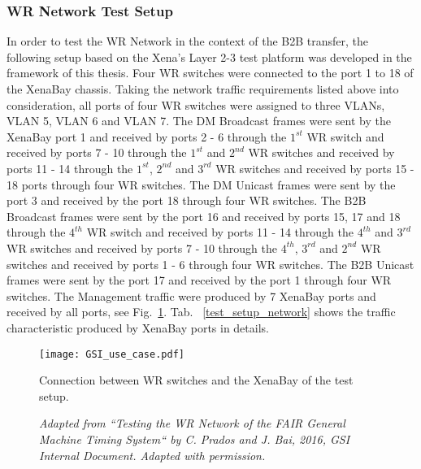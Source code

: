 \subsubsection{WR Network Test Setup}
In order to test the WR Network in the context of the B2B transfer, the following setup based on the Xena's Layer 2-3 test platform was developed in the framework of this thesis. Four WR switches were connected to the port 1 to 18 of the XenaBay chassis. Taking the network traffic requirements listed above into consideration, all ports of four WR switches were assigned to three VLANs, VLAN 5, VLAN 6 and VLAN 7. The DM Broadcast frames were sent by the XenaBay port 1 and received by ports 2 - 6 through the $1^{st}$ WR switch and received by ports 7 - 10 through the $1^{st}$ and $2^{nd}$ WR switches and received by ports 11 - 14 through the $1^{st}$, $2^{nd}$ and $3^{rd}$ WR switches and received by ports 15 - 18 ports through four WR switches. The DM Unicast frames were sent by the port 3 and received by the port 18 through four WR switches. The B2B Broadcast frames were sent by the port 16 and received by ports 15, 17 and 18 through the $4^{th}$ WR switch and received by ports 11 - 14 through the $4^{th}$ and $3^{rd}$ WR switches and received by ports 7 - 10 through the $4^{th}$, $3^{rd}$ and $2^{nd}$ WR switches and received by ports 1 - 6 through four WR switches. The B2B Unicast frames were sent by the port 17 and received by the port 1 through four WR switches. The Management traffic were produced by 7 XenaBay ports and received by all ports, see Fig.~\ref{GSI_use_case.jpg}.  Tab. ~\ref{test_setup_network} shows the traffic characteristic produced by XenaBay ports in details. 
\begin{figure}[H]
   \centering   
   \texttt{[image: GSI\_use\_case.pdf]}
   \caption{Connection between WR switches and the XenaBay of the test setup.}
    \caption*{\textsl{\small{Adapted from ``Testing the WR Network of the FAIR General Machine Timing System`` by C. Prados and J. Bai, 2016, GSI Internal Document. Adapted with permission.}}}
   \label{GSI_use_case.jpg}
\end{figure}

